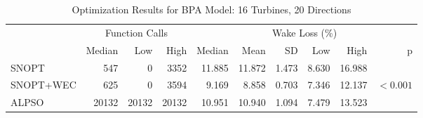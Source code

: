 \documentclass[a4paper]{jpconf}
\begin{document}
%
\begin{table}
	\centering
	\caption{Optimization Results for BPA Model: 16 Turbines, 20 Directions}
	\label{tab:case1}
	\begin{tabular}{lrrrrrrrrr}
		\toprule
		{} & \multicolumn{3}{c}{Function Calls} & \multicolumn{6}{c}{Wake Loss (\%)} \\
		\cmidrule(lr){2-4} \cmidrule(lr){5-10}
		{} &         Median &    Low &   High &        Median &   Mean &    SD &   Low &   High &          p \\
		\cmidrule(lr){2-4} \cmidrule(lr){5-10}
		SNOPT     &            547 &      0 &   3352 &        11.885 & 11.872 & 1.473 & 8.630 & 16.988 &            \\
		SNOPT+WEC &            625 &      0 &   3594 &         9.169 &  8.858 & 0.703 & 7.346 & 12.137 &  $< 0.001$ \\
		ALPSO     &          20132 &  20132 &  20132 &        10.951 & 10.940 & 1.094 & 7.479 & 13.523 &            \\
		\bottomrule
	\end{tabular}
\end{table}


%
\end{document}

